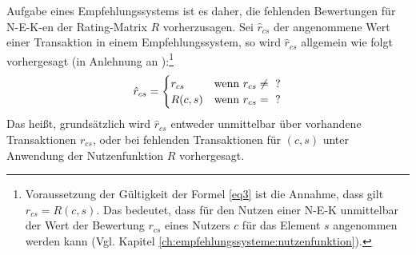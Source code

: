 Aufgabe eines Empfehlungssystems ist es daher, die fehlenden Bewertungen für \ac{N-E-K}-en der Rating-Matrix $R$ vorherzusagen.
Sei $\hat{r}_{cs}$ der angenommene Wert einer Transaktion in einem Empfehlungssystem, so wird $\hat{r}_{cs}$ allgemein wie folgt vorhergesagt (in Anlehnung an \cite[S. 743]{adomavicius:inproceedings}):\footnote{Voraussetzung der Gültigkeit der Formel \ref{eq3} ist die Annahme, dass gilt $r_{cs} = R(c,s)$. Das bedeutet, dass für den Nutzen einer \ac{N-E-K} unmittelbar der Wert der Bewertung $r_{cs}$ eines Nutzers $c$ für das Element $s$ angenommen werden kann (Vgl. Kapitel \ref{ch:empfehlungssysteme:nutzenfunktion}).}
\begin{equation}\label{eq3}
\hat{r}_{cs} =
    \begin{cases}
        r_{cs} & \textnormal{wenn } r_{cs} \neq \textnormal{ ?} \\
        R(c,s) & \textnormal{wenn }r_{cs} = \textnormal{ ?} \\
    \end{cases}
\end{equation}
Das heißt, grundsätzlich wird $\hat{r}_{cs}$ entweder unmittelbar über vorhandene Transaktionen $r_{cs}$, oder bei fehlenden Transaktionen für $(c,s)$ unter Anwendung der Nutzenfunktion $R$ vorhergesagt.

